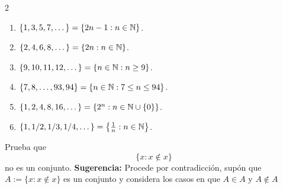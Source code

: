 \documentclass[12pt,a4paper]{book}
\begin{document}
    \begin{solucion}
        \begin{multicols}{2}
            \begin{enumerate}
            \item[(a)] $\{1,3,5,7,\dots\}=\{2n-1:n\in\mathbb{N}\}$.
            \item[(b)] $\{2,4,6,8,\dots\}=\{2n:n\in\mathbb{N}\}$.
            \item[(c)] $\{9,10,11,12,\dots\}=\{n\in\mathbb{N}: n\geq9\}$.
            \item[(d)] $\{7,8,\dots,93,94\}=\{n\in\mathbb{N}:7\leq n\leq94\}$.
            \item[(e)] $\{1,2,4,8,16,\dots\}=\{2^{n}:n\in\mathbb{N}\cup\{0\}\}$.
            \item[(f)] $\{1,1/2,1/3,1/4,\dots\}=\left\{\frac{1}{n}:n\in\mathbb{N}\right\}$.  
            \end{enumerate}            
        \end{multicols}
    \end{solucion}

    \begin{ejercicio}
        Prueba que
        \begin{equation*}
            \{x:x\notin x\}
        \end{equation*}
        no es un conjunto. \textbf{Sugerencia:} Procede por contradicción, supón que $A:=\{x:x\notin x\}$
        es un conjunto y considera los casos en que $A\in A$ y $A\notin A$
    \end{ejercicio}
\end{document}
